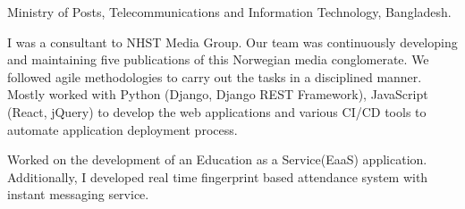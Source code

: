 \documentclass[10pt,a4paper]{altacv}
\begin{document}
\tagline{}

\begin{fullwidth}
\makecvheader
\end{fullwidth}


Ministry of Posts, Telecommunications and Information Technology, Bangladesh.

\divider


I was a consultant to NHST Media Group. Our team was continuously developing and maintaining five publications of this Norwegian media conglomerate. We followed agile methodologies to carry out the tasks in a disciplined manner. Mostly worked with Python (Django, Django REST Framework), JavaScript (React, jQuery) to develop the web applications and various CI/CD tools to automate application deployment process.

\divider

Worked on the development of an Education as a Service(EaaS) application. Additionally, I developed real time fingerprint based attendance system with instant messaging service.
\end{document}
